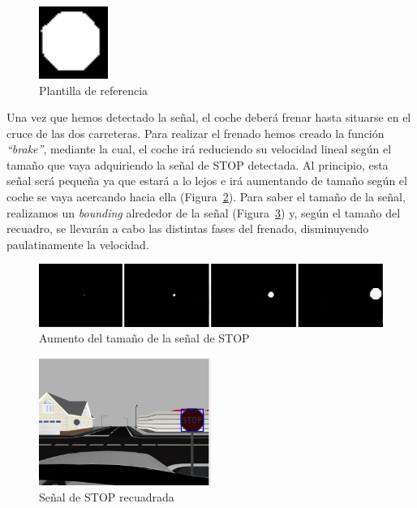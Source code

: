 \begin{figure}[H]
  \begin{center}
    \includegraphics[width=0.2\textwidth]{figures/Stop/template.png}
		\caption{Plantilla de referencia}
		\label{fig.template}
		\end{center}
\end{figure}

Una vez que hemos detectado la señal, el coche deberá frenar hasta situarse en el cruce de las dos carreteras. Para realizar el frenado hemos creado la función \textit{``brake''}, mediante la cual, el coche irá reduciendo su velocidad lineal según el tamaño que vaya adquiriendo la señal de STOP detectada. Al principio, esta señal será pequeña ya que estará a lo lejos e irá aumentando de tamaño según el coche se vaya acercando hacia ella (Figura~\ref{fig.brake}). Para saber el tamaño de la señal, realizamos un \textit{bounding} alrededor de la señal (Figura~\ref{fig.stopRecuadro}) y, según el tamaño del recuadro, se llevarán a cabo las distintas fases del frenado, disminuyendo paulatinamente la velocidad. \\

\begin{figure}[H]
  \begin{center}
    \includegraphics[width=1.0\textwidth]{figures/Stop/brake.jpg}
		\caption{Aumento del tamaño de la señal de STOP}
		\label{fig.brake}
		\end{center}
\end{figure}

\begin{figure}[H]
  \begin{center}
    \includegraphics[width=0.5\textwidth]{figures/Stop/stopRecuadro.jpg}
		\caption{Señal de STOP recuadrada}
		\label{fig.stopRecuadro}
		\end{center}
\end{figure}

